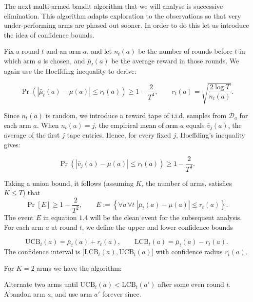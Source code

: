\documentclass[12pt]{article}
\begin{document}
The next multi-armed bandit algorithm that we will analyse is successive elimination. This algorithm adapts exploration to the observations so that very under-performing arms are phased out sooner. In order to do this let us introduce the idea of confidence bounds. 

Fix a round $t$ and an arm $a$, and let $n_t(a)$ be the number of rounds before $t$ in which arm $a$ is chosen, and $\bar{\mu}_t(a)$ be the average reward in those rounds. We again use the Hoeffding inequality to derive:

\begin{equation}
\Pr\!\left(\left|\bar{\mu}_t(a)-\mu(a)\right|\le r_t(a)\right)\ge 1-\frac{2}{T^4},
\qquad
r_t(a)=\sqrt{\frac{2\log T}{n_t(a)}}.
\tag{3.3}
\label{eq:confidence-bound}
\end{equation}

Since $n_t(a)$ is random, we introduce a reward tape of i.i.d. samples from $\mathcal{D}_a$ for each arm $a$. When $n_t(a)=j$, the empirical mean of arm $a$ equals $\bar v_j(a)$, the average of the first $j$ tape entries. Hence, for every fixed $j$, Hoeffding's inequality gives:

\[
\Pr\!\left(\left|\bar{v}_j(a)-\mu(a)\right|\le r_t(a)\right)\ge 1-\frac{2}{T^4}.
\]

\vspace{5mm}

Taking a union bound, it follows (assuming $K$, the number of arms, satisfies $K \le T$) that
\begin{equation}
\Pr[E] \ge 1 - \frac{2}{T^2},
\qquad
E := \left\{ \forall a\, \forall t \; \left| \bar{\mu}_t(a) - \mu(a) \right| \le r_t(a) \right\}.
\tag{3.4}
\end{equation}
The event $E$ in equation $1.4$ will be the clean event for the subsequent analysis. For each arm $a$ at round $t$, we define the upper and lower confidence bounds


\[
\mathrm{UCB}_t(a) = \bar{\mu}_t(a) + r_t(a),
\qquad
\mathrm{LCB}_t(a) = \bar{\mu}_t(a) - r_t(a).
\]
The confidence interval is $\bigl[\mathrm{LCB}_t(a), \mathrm{UCB}_t(a)\bigr]$ with confidence radius $r_t(a)$.

\noindent For $K = 2$ arms we have the algorithm:


\begin{algorithm}
\caption{Successive Elimination, $K = 2$}
\begin{algorithmic}
\STATE Alternate two arms until $\mathrm{UCB}_t(a) < \mathrm{LCB}_t(a')$ after some even round $t$.
\STATE Abandon arm $a$, and use arm $a'$ forever since.
\end{algorithmic}
\end{algorithm}
\end{document}
